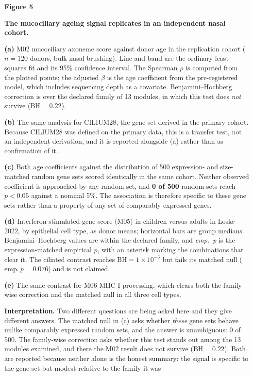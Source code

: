 \documentclass[11pt,a4paper]{article}
\newcommand{\legend}[3]{%
  \clearpage
  {\large\textbf{Figure #1}\par}
  \vspace{2pt}
  {\textbf{#2}\par}
  \vspace{6pt}
  \small #3\par
}
\begin{document}
\legend{5}{The mucociliary ageing signal replicates in an independent nasal cohort.}{%
\textbf{(a)} M02 mucociliary axoneme score against donor age in the replication cohort
($n=120$ donors, bulk nasal brushing). Line and band are the ordinary least-squares fit and
its 95\% confidence interval. The Spearman $\rho$ is computed from the plotted points; the
adjusted $\beta$ is the age coefficient from the pre-registered model, which includes
sequencing depth as a covariate. Benjamini--Hochberg correction is over the declared family
of 13 modules, in which this test does \emph{not} survive ($\mathrm{BH}=0.22$).
\par
\textbf{(b)} The same analysis for CILIUM28, the gene set derived in the primary cohort.
Because CILIUM28 was defined on the primary data, this is a transfer test, not an independent
derivation, and it is reported alongside (a) rather than as confirmation of it.
\par
\textbf{(c)} Both age coefficients against the distribution of 500 expression- and
size-matched random gene sets scored identically in the same cohort. Neither observed
coefficient is approached by any random set, and \textbf{0 of 500} random sets reach $p<0.05$
against a nominal 5\%. The association is therefore specific to these gene sets rather than a
property of any set of comparably expressed genes.
\par
\textbf{(d)} Interferon-stimulated gene score (M05) in children versus adults in Loske 2022,
by epithelial cell type, as donor means; horizontal bars are group medians.
Benjamini--Hochberg values are within the declared family, and \emph{emp.\ p} is the
expression-matched empirical $p$, with an asterisk marking the combinations that clear it.
The ciliated contrast reaches $\mathrm{BH}=1\times10^{-3}$ but fails its matched null
($\mathrm{emp.}\ p=0.076$) and is not claimed.
\par
\textbf{(e)} The same contrast for M06 MHC-I processing, which clears both the family-wise
correction and the matched null in all three cell types.
\par
\textbf{Interpretation.} Two different questions are being asked here and they give different
answers. The matched null in (c) asks whether \emph{these} gene sets behave unlike comparably
expressed random sets, and the answer is unambiguous: 0 of 500. The family-wise correction
asks whether this test stands out among the 13 modules examined, and there the M02 result does
not survive ($\mathrm{BH}=0.22$). Both are reported because neither alone is the honest
summary: the signal is specific to the gene set but modest relative to the family it was
}
\end{document}
